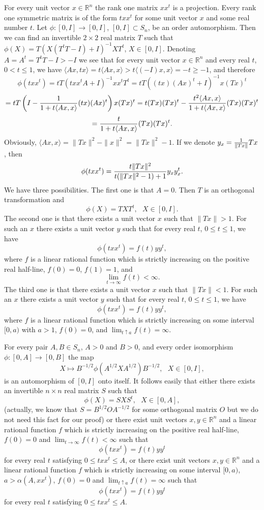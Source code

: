 \documentclass{article}
\begin{document}
For every unit vector $x \in \mathbb{R}^n$ the rank one matrix $xx^t$ is a projection. Every rank one symmetric matrix is of the form $txx^t$ for some unit vector $x$ and some real number $t$. Let $\phi : [0,I] \to [0,I]$, $[0,I] \subset S_n$, be an order automorphism. Then we can find an invertible $2 \times 2$ real matrix $T$ such that $\phi (X) = T ( X (T^t T -I) + I)^{-1}XT^t$, $X \in [0,I]$. Denoting $A = A^t = T^t T -I  > -I$ we see that for every unit vector 
$x \in \mathbb{R}^n$ and every real $t$, $0 < t \le 1$, we have $\langle Ax, tx \rangle = t \langle Ax, x \rangle > t  \langle (-I)x, x \rangle = -t \ge -1$, and therefore 
$$
\phi (t xx^t) = tT( txx^t A + I)^{-1} xx^t T^t = tT( (tx)(Ax)^t  + I)^{-1} x(Tx)^t   
$$
$$
= tT \left( I - { 1 \over 1 + t\langle Ax,x \rangle} (tx)(Ax)^t \right)x (Tx)^t = t (Tx)(Tx)^t - { t^2 \langle Ax, x \rangle \over 1 + t \langle Ax, x \rangle } (Tx)(Tx)^t
$$
$$
= { t \over 1 +  t\langle Ax,x \rangle} (Tx)(Tx)^t.
$$
Obviously, $\langle Ax,x \rangle = \| Tx \|^2 - \| x \|^2 = \| Tx \|^2 - 1$. If we denote $y_x = {1 \over \| Tx \|} Tx$, then 
$$
\phi (t xx^t) = { t \| Tx \|^2 \over t(\|Tx \|^2 - 1 ) + 1 } y_x y_{x}^t.
$$
We have three possibilities. The first one is that $A = 0$. Then $T$ is an orthogonal transformation and
$$
\phi (X) = TXT^t, \ \ \ X \in [0,I].
$$
The second one is that there exists a unit vector $x$ such that $\| Tx \| > 1$. For such an $x$ there exists a unit vector $y$ such that for every real $t$, $0 \le t \le 1$, we have
$$
\phi (t xx^t) = f(t) yy^t,
$$
where $f$ is a linear rational function which is strictly increasing on the positive real half-line, $f(0)= 0$, $f(1) = 1$, and $$\lim_{t \to \infty} f(t) < \infty.$$
The third one is that there exists a unit vector $x$ such that $\| Tx \| < 1$. For such an $x$ there exists a unit vector $y$ such that for every real $t$, $0 \le t \le 1$, we have
$$
\phi (t xx^t) = f(t) yy^t,
$$
where $f$ is a linear rational function which is strictly increasing on some interval $[0, a)$ with $a>1$, $f(0)= 0$, and $\lim_{t \uparrow a} f(t) = \infty$.

For every pair $A,B \in S_n$, $A > 0$ and $B > 0$, and every order isomorphism $\phi : [0,A] \to [0,B]$ the map
$$
X \mapsto B^{-1/2}\phi ( A^{1/2} X A^{1 / 2})B^{-1/2}, \ \ \ X \in [0,I],
$$
is an automorphism of $[0,I]$ onto itself. It follows easily that either there exists an invertible $n \times n$ real matrix $S$ such that
$$
\phi (X) = SXS^t, \ \ \ X \in [0,A],
$$
(actually, we know that $S = B^{1/2}OA^{-1/2}$ for some orthogonal matrix $O$ but we do not need this fact for our proof)
or there exist unit vectors $x,y \in \mathbb{R}^n$ and a linear rational function $f$ which is strictly increasing on the positive real half-line, $f(0)= 0$ and $\lim_{t \to \infty} f(t) < \infty$ such that
$$
\phi (t xx^t) = f(t) yy^t
$$
for every real $t$ satisfying $ 0 \le txx^t \le A$, or
there exist unit vectors $x,y \in \mathbb{R}^n$ and a linear rational function $f$ which is strictly increasing on some interval $[0, a)$, $a > \alpha (A, xx^t)$, $f(0)= 0$  and $\lim_{t \uparrow a} f(t) = \infty$ such that
$$
\phi (t xx^t) = f(t) yy^t
$$
for every real $t$ satisfying $ 0 \le txx^t \le A$.
\end{document}
